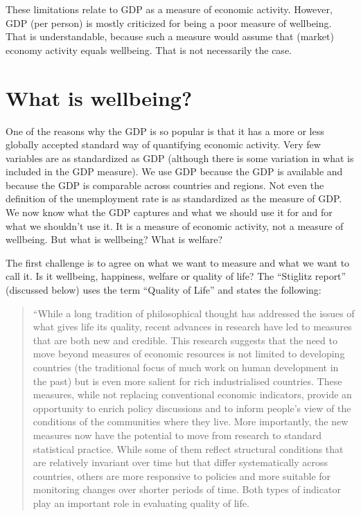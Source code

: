 \documentclass[
]{book}
\begin{document}
These limitations relate to GDP as a measure of economic activity. However, GDP (per person) is mostly criticized for being a poor measure of wellbeing. That is understandable, because such a measure would assume that (market) economy activity equals wellbeing. That is not necessarily the case.

\hypertarget{what-is-wellbeing}{%
\section{What is wellbeing?}\label{what-is-wellbeing}}

One of the reasons why the GDP is so popular is that it has a more or less globally accepted standard way of quantifying economic activity. Very few variables are as standardized as GDP (although there is some variation in what is included in the GDP measure). We use GDP because the GDP is available and because the GDP is comparable across countries and regions. Not even the definition of the unemployment rate is as standardized as the measure of GDP. We now know what the GDP captures and what we should use it for and for what we shouldn't use it. It is a measure of economic activity, not a measure of wellbeing. But what is wellbeing? What is welfare?

The first challenge is to agree on what we want to measure and what we want to call it. Is it wellbeing, happiness, welfare or quality of life? The ``Stiglitz report'' \citep{stiglitz2010report} (discussed below) uses the term ``Quality of Life'' and states the following:

\begin{quote}
``While a long tradition of philosophical thought has addressed the issues of what gives
life its quality, recent advances in research have led to measures that are both new and
credible. This research suggests that the need to move beyond measures of economic
resources is not limited to developing countries (the traditional focus of much work on
human development in the past) but is even more salient for rich industrialised countries.
These measures, while not replacing conventional economic indicators, provide an
opportunity to enrich policy discussions and to inform people's view of the conditions of the
communities where they live. More importantly, the new measures now have the potential to
move from research to standard statistical practice. While some of them reflect structural
conditions that are relatively invariant over time but that differ systematically across
countries, others are more responsive to policies and more suitable for monitoring changes
over shorter periods of time. Both types of indicator play an important role in evaluating
quality of life.
\end{quote}
\end{document}
